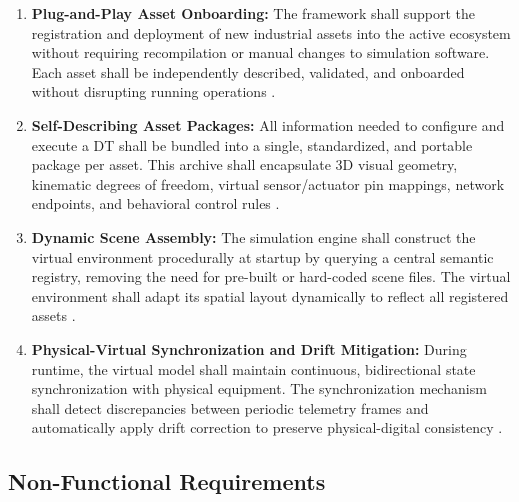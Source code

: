 \begin{enumerate}
    \item[\textbf{FR1}] \textbf{Plug-and-Play Asset Onboarding:} The framework shall support the registration and deployment of new industrial assets into the active ecosystem without requiring recompilation or manual changes to simulation software. Each asset shall be independently described, validated, and onboarded without disrupting running operations \cite{Rocha2024,AshtariTalkhestani2019}.

    \item[\textbf{FR2}] \textbf{Self-Describing Asset Packages:} All information needed to configure and execute a \gls{DT} shall be bundled into a single, standardized, and portable package per asset. This archive shall encapsulate 3D visual geometry, kinematic degrees of freedom, virtual sensor/actuator pin mappings, network endpoints, and behavioral control rules \cite{Lu2025,Gollner2022}.

    \item[\textbf{FR3}] \textbf{Dynamic Scene Assembly:} The simulation engine shall construct the virtual environment procedurally at startup by querying a central semantic registry, removing the need for pre-built or hard-coded scene files. The virtual environment shall adapt its spatial layout dynamically to reflect all registered assets \cite{Alexopoulos2025}.

    \item[\textbf{FR4}] \textbf{Physical-Virtual Synchronization and Drift Mitigation:} During runtime, the virtual model shall maintain continuous, bidirectional state synchronization with physical equipment. The synchronization mechanism shall detect discrepancies between periodic telemetry frames and automatically apply drift correction to preserve physical-digital consistency \cite{Kritzinger2018,Tao2019}.
\end{enumerate}

\subsection{Non-Functional Requirements}

